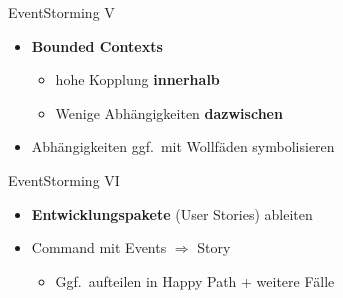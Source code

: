 \begin{frame}[fragile]{EventStorming V}

\begin{itemize}
\item \textbf{Bounded Contexts}
\begin{itemize}
\item hohe Kopplung \textbf{innerhalb}
\item Wenige Abhängigkeiten \textbf{dazwischen}
\end{itemize}
\item Abhängigkeiten ggf.~mit Wollfäden symbolisieren
\end{itemize}

\end{frame}


\begin{frame}[fragile]{EventStorming VI}

\begin{itemize}
\item \textbf{Entwicklungspakete} (User Stories) ableiten
\item Command mit Events $\Rightarrow$ Story
\begin{itemize}
\item Ggf.~aufteilen in Happy Path + weitere Fälle
\end{itemize}
\end{itemize}

\end{frame}

